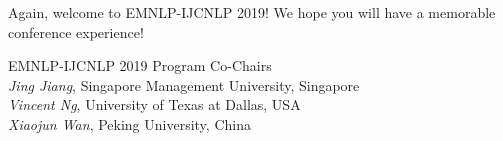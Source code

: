 Again, welcome to EMNLP-IJCNLP 2019! We hope you will have a memorable conference experience!


\vspace{3em}

\noindent EMNLP-IJCNLP 2019 Program Co-Chairs \\

\noindent \textit{Jing Jiang}, Singapore Management University, Singapore \\
\noindent \textit{Vincent Ng}, University of Texas at Dallas, USA\\
\noindent \textit{Xiaojun Wan}, Peking University, China

